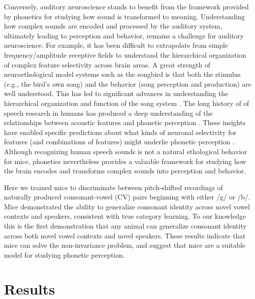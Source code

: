 Conversely, auditory neuroscience stands to benefit from the framework provided by phonetics for studying how sound is transformed to meaning. Understanding how complex sounds are encoded and processed by the auditory system, ultimately leading to perception and behavior, remains a challenge for auditory neuroscience. For example, it has been difficult to extrapolate from simple frequency/amplitude receptive fields to understand the hierarchical organization of complex feature selectivity across brain areas. A great strength of neuroethological model systems such as the songbird is that both the stimulus (e.g., the bird's own song) and the behavior (song perception and production) are well understood. This has led to significant advances in understanding the hierarchical organization and function of the song system \cite{Brenowitz1997,Theunissen2014}. The long history of of speech research in humans has produced a deep understanding of the relationships between acoustic features and phonetic perception \cite{Peterson1952}. These insights have enabled specific predictions about what kinds of neuronal selectivity for features (and combinations of features) might underlie phonetic perception \cite{Sussman1998}. Although recognizing human speech sounds is not a natural ethological behavior for mice, phonetics nevertheless provides a valuable framework for studying how the brain encodes and transforms complex sounds into perception and behavior.

Here we trained mice to discriminate between pitch-shifted recordings of naturally produced consonant-vowel (CV) pairs beginning with either /g/ or /b/. Mice demonstrated the ability to generalize consonant identity across novel vowel contexts and speakers, consistent with true category learning. To our knowledge this is the first demonstration that any animal can generalize consonant identity across both novel vowel contexts and novel speakers. These results indicate that mice can solve the non-invariance problem, and suggest that mice are a suitable model for studying phonetic perception.

%
%

\section{\Large Results}

